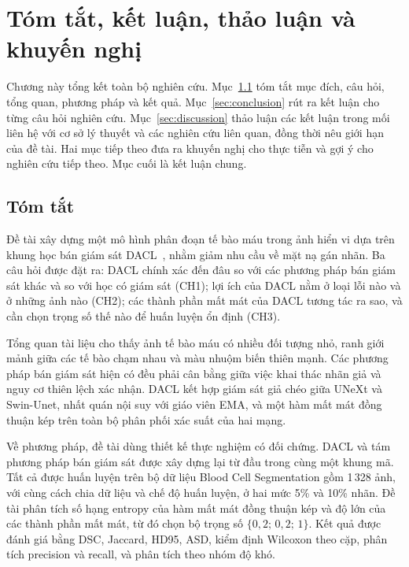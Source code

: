 \chapter{Tóm tắt, kết luận, thảo luận và khuyến nghị}
\label{chap:ketluan}

Chương này tổng kết toàn bộ nghiên cứu. Mục~\ref{sec:summary} tóm tắt mục đích, câu hỏi, tổng quan, phương pháp và kết quả. Mục~\ref{sec:conclusion} rút ra kết luận cho từng câu hỏi nghiên cứu. Mục~\ref{sec:discussion} thảo luận các kết luận trong mối liên hệ với cơ sở lý thuyết và các nghiên cứu liên quan, đồng thời nêu giới hạn của đề tài. Hai mục tiếp theo đưa ra khuyến nghị cho thực tiễn và gợi ý cho nghiên cứu tiếp theo. Mục cuối là kết luận chung.

\section{Tóm tắt}
\label{sec:summary}

Đề tài xây dựng một mô hình phân đoạn tế bào máu trong ảnh hiển vi dựa trên khung học bán giám sát DACL~\cite{wang2026dacl}, nhằm giảm nhu cầu về mặt nạ gán nhãn. Ba câu hỏi được đặt ra: DACL chính xác đến đâu so với các phương pháp bán giám sát khác và so với học có giám sát (CH1); lợi ích của DACL nằm ở loại lỗi nào và ở những ảnh nào (CH2); các thành phần mất mát của DACL tương tác ra sao, và cần chọn trọng số thế nào để huấn luyện ổn định (CH3).

Tổng quan tài liệu cho thấy ảnh tế bào máu có nhiều đối tượng nhỏ, ranh giới mảnh giữa các tế bào chạm nhau và màu nhuộm biến thiên mạnh. Các phương pháp bán giám sát hiện có đều phải cân bằng giữa việc khai thác nhãn giả và nguy cơ thiên lệch xác nhận. DACL kết hợp giám sát giả chéo giữa UNeXt và Swin-Unet, nhất quán nội suy với giáo viên EMA, và một hàm mất mát đồng thuận kép trên toàn bộ phân phối xác suất của hai mạng.

Về phương pháp, đề tài dùng thiết kế thực nghiệm có đối chứng. DACL và tám phương pháp bán giám sát được xây dựng lại từ đầu trong cùng một khung mã. Tất cả được huấn luyện trên bộ dữ liệu Blood Cell Segmentation gồm 1\,328 ảnh, với cùng cách chia dữ liệu và chế độ huấn luyện, ở hai mức 5\% và 10\% nhãn. Đề tài phân tích số hạng entropy của hàm mất mát đồng thuận kép và độ lớn của các thành phần mất mát, từ đó chọn bộ trọng số $\{0{,}2;\,0{,}2;\,1\}$. Kết quả được đánh giá bằng DSC, Jaccard, HD95, ASD, kiểm định Wilcoxon theo cặp, phân tích precision và recall, và phân tích theo nhóm độ khó.

